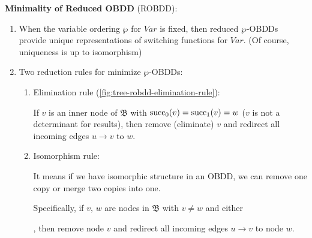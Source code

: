 \documentclass[../src/handouts/main.tex]{subfiles}
\begin{document}
\textbf{Minimality of Reduced OBDD} (ROBDD):

\begin{enumerate}
  \item When the variable ordering $\wp$ for $Var$ is fixed, then reduced $\wp$-OBDDs provide unique representations of switching functions for $Var$. (Of course, uniqueness is up to isomorphism)
  \item Two reduction rules for minimize $\wp$-OBDDs:
    \begin{enumerate}
      \item Elimination rule (\cref{fig:tree-robdd-elimination-rule}):

        If $v$ is an inner node of $\mathfrak{B}$ with $\operatorname{succ}_0(v) = \operatorname{succ}_1(v) = w$ ($v$ is not a determinant for results), then remove (eliminate) $v$ and redirect all incoming edges $u \rightarrow v$ to $w$.

      \item Isomorphism rule:

        It means if we have isomorphic structure in an OBDD, we can remove one copy or merge two copies into one.

        Specifically, if $v,\, w$ are nodes in $\mathfrak{B}$ with $v \neq w$ and either
        \vspace{1em}
        , then remove node $v$ and redirect all incoming edges $u \rightarrow v$ to node $w$.
    \end{enumerate}
\end{enumerate}
\end{document}
